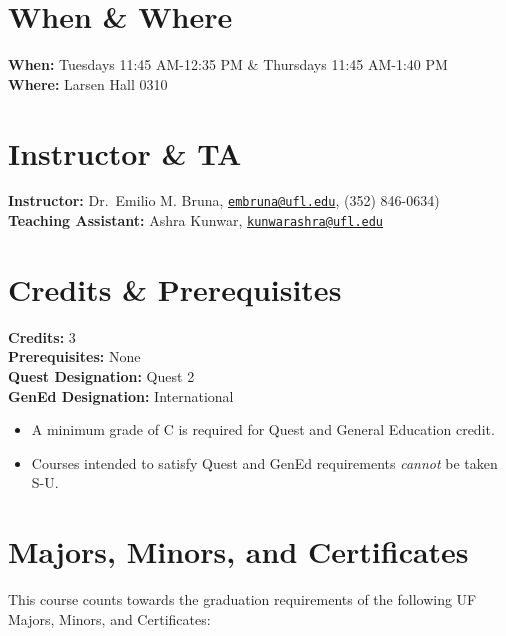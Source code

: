 \documentclass[
  12pt,
  letterpaper,
  DIV=11,
  numbers=noendperiod]{scrreprt}
\providecommand{\tightlist}{%
  \setlength{\itemsep}{0pt}\setlength{\parskip}{0pt}}
\begin{document}
\section*{When \& Where}\label{when-where}

\textbf{When:} Tuesdays 11:45 AM-12:35 PM \& Thursdays 11:45 AM-1:40
PM\\
\textbf{Where:} Larsen Hall 0310~

\section*{Instructor \& TA}\label{instructor-ta}

\textbf{Instructor:} Dr.~Emilio M. Bruna,
\href{mailto:embruna@ufl.edu}{\nolinkurl{embruna@ufl.edu}}, (352)
846-0634)~\\
\textbf{Teaching Assistant:} Ashra Kunwar,
\href{mailto:kunwarashra@ufl.edu}{\nolinkurl{kunwarashra@ufl.edu}}

\section*{Credits \& Prerequisites}\label{credits-prerequisites}

\textbf{Credits:} 3\\
\textbf{Prerequisites:} None\\
\textbf{Quest Designation:} Quest 2\\
\textbf{GenEd Designation:} International

\begin{itemize}
\tightlist
\item
  A minimum grade of C is required for Quest and General Education
  credit.
\item
  Courses intended to satisfy Quest and GenEd requirements \emph{cannot}
  be taken S-U.
\end{itemize}

\section*{Majors, Minors, and
Certificates}\label{majors-minors-and-certificates}

This course counts towards the graduation requirements of the following
UF Majors, Minors, and Certificates:
\end{document}
